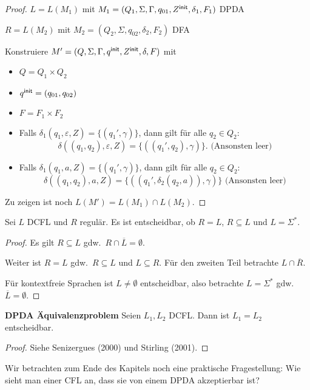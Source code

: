 {\begin{proof}
    $L = L (M_1)$ mit $M_1 = (Q_1, \Sigma, \Gamma, q_{01}, Z^\mathsf{init},
    \delta_1, F_1)$ \ac{DPDA}

    $R = L (M_2)$ mit $M_2 = (Q_2, \Sigma, q_{02}, \delta_2, F_2)$
    \ac{DFA}

    Konstruiere $M'= (Q, \Sigma, \Gamma, q^\mathsf{init}, Z^\mathsf{init}, \delta, F)$ mit
    \begin{itemize}
    \item $Q = Q_1 \times Q_2$
    \item $q^\mathsf{init} = (q_{01}, q_{02})$
    \item $F = F_1  \times F_2$
    \item Falls $\delta_1 (q_1, \varepsilon, Z) = \{(q_1', \gamma)\}$, dann gilt für alle $q_2\in Q_2$: 
      \[ \delta ((q_1, q_2), \varepsilon, Z)
      = \{((q_1', q_2), \gamma)\} \text{.     (Ansonsten leer)} \]
    \item Falls $\delta_1 (q_1, a, Z) = \{(q_1', \gamma)\}$, dann gilt für alle $q_2\in Q_2$: 
      \[ \delta ((q_1, q_2), a, Z) =
      \{((q_1', \delta_2 (q_2, a)), \gamma)\} \text{   (Ansonsten leer)} \]
    \end{itemize}
    Zu zeigen ist noch $L (M') = L (M_1) \cap L (M_2)$.
\end{proof}
\begin{Satz}
    Sei $L$ DCFL und $R$ regulär.
    Es ist entscheidbar, ob $R=L$, $R\subseteq L$ und $L=\Sigma^*$.
\end{Satz}
\begin{proof}
    Es gilt $R\subseteq L$ gdw.\ $R \cap \overline{L} = \emptyset$.
    
    Weiter ist $R = L$ gdw.\ $R\subseteq L$ und $L \subseteq R$. Für den zweiten Teil betrachte $L\cap \overline{R}$.
    
    Für kontextfreie Sprachen ist $L\ne \emptyset$ entscheidbar, also betrachte $L=\Sigma^*$ gdw.\ $\overline{L}=\emptyset$.
\end{proof}

\begin{Satz} \textbf{DPDA Äquivalenzproblem}
    Seien $L_1, L_2$ DCFL. Dann ist $L_1 = L_2$ entscheidbar.
\end{Satz}

\begin{proof}
    Siehe Senizergues (2000) und Stirling (2001).
\end{proof}

Wir betrachten zum Ende des Kapitels noch eine praktische Fragestellung: Wie sieht man einer CFL an, dass sie von einem DPDA akzeptierbar ist?

}
